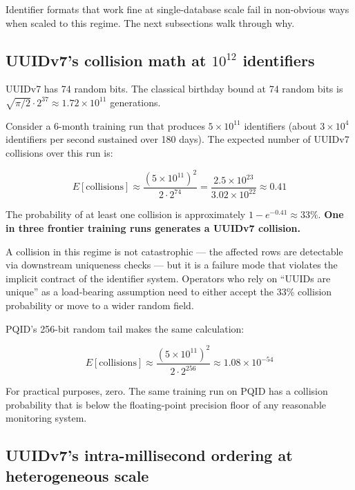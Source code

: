 Identifier formats that work fine at single-database scale fail in non-obvious ways when scaled to this regime. The next subsections walk through why.

\subsection{UUIDv7's collision math at $10^{12}$ identifiers}

UUIDv7 has 74 random bits. The classical birthday bound at 74 random bits is $\sqrt{\pi/2} \cdot 2^{37} \approx 1.72 \times 10^{11}$ generations.

Consider a 6-month training run that produces $5 \times 10^{11}$ identifiers (about $3 \times 10^4$ identifiers per second sustained over 180 days). The expected number of UUIDv7 collisions over this run is:

\begin{equation}
E[\text{collisions}] \approx \frac{(5 \times 10^{11})^2}{2 \cdot 2^{74}} = \frac{2.5 \times 10^{23}}{3.02 \times 10^{22}} \approx 0.41
\end{equation}

The probability of at least one collision is approximately $1 - e^{-0.41} \approx 33\%$. \textbf{One in three frontier training runs generates a UUIDv7 collision.}

A collision in this regime is not catastrophic --- the affected rows are detectable via downstream uniqueness checks --- but it is a failure mode that violates the implicit contract of the identifier system. Operators who rely on ``UUIDs are unique'' as a load-bearing assumption need to either accept the 33\% collision probability or move to a wider random field.

PQID's 256-bit random tail makes the same calculation:

\begin{equation}
E[\text{collisions}] \approx \frac{(5 \times 10^{11})^2}{2 \cdot 2^{256}} \approx 1.08 \times 10^{-54}
\end{equation}

For practical purposes, zero. The same training run on PQID has a collision probability that is below the floating-point precision floor of any reasonable monitoring system.

\subsection{UUIDv7's intra-millisecond ordering at heterogeneous scale}

